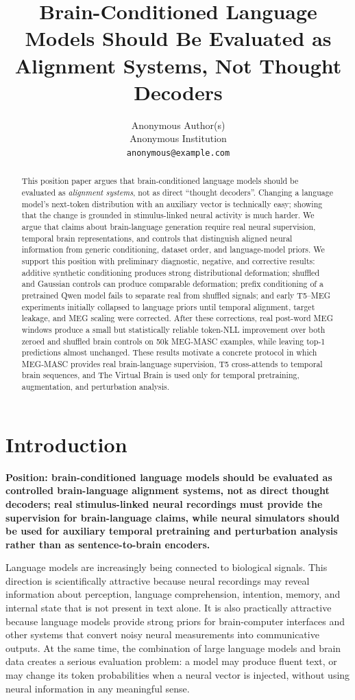 \documentclass{article}
\title{Brain-Conditioned Language Models Should Be Evaluated as Alignment Systems, Not Thought Decoders}
\author{%
  Anonymous Author(s) \\
  Anonymous Institution \\
  \texttt{anonymous@example.com}
}
\begin{document}
\maketitle

\begin{abstract}
This position paper argues that brain-conditioned language models should be evaluated as \emph{alignment systems}, not as direct ``thought decoders''.
Changing a language model's next-token distribution with an auxiliary vector is technically easy; showing that the change is grounded in stimulus-linked neural activity is much harder.
We argue that claims about brain-language generation require real neural supervision, temporal brain representations, and controls that distinguish aligned neural information from generic conditioning, dataset order, and language-model priors.
We support this position with preliminary diagnostic, negative, and corrective results: additive synthetic conditioning produces strong distributional deformation; shuffled and Gaussian controls can produce comparable deformation; prefix conditioning of a pretrained Qwen model fails to separate real from shuffled signals; and early T5--MEG experiments initially collapsed to language priors until temporal alignment, target leakage, and MEG scaling were corrected.
After these corrections, real post-word MEG windows produce a small but statistically reliable token-NLL improvement over both zeroed and shuffled brain controls on 50k MEG-MASC examples, while leaving top-1 predictions almost unchanged.
These results motivate a concrete protocol in which MEG-MASC provides real brain-language supervision, T5 cross-attends to temporal brain sequences, and The Virtual Brain is used only for temporal pretraining, augmentation, and perturbation analysis.
\end{abstract}

\section{Introduction}

\textbf{Position: brain-conditioned language models should be evaluated as controlled brain-language alignment systems, not as direct thought decoders; real stimulus-linked neural recordings must provide the supervision for brain-language claims, while neural simulators should be used for auxiliary temporal pretraining and perturbation analysis rather than as sentence-to-brain encoders.}

Language models are increasingly being connected to biological signals.
This direction is scientifically attractive because neural recordings may reveal information about perception, language comprehension, intention, memory, and internal state that is not present in text alone.
It is also practically attractive because language models provide strong priors for brain-computer interfaces and other systems that convert noisy neural measurements into communicative outputs.
At the same time, the combination of large language models and brain data creates a serious evaluation problem: a model may produce fluent text, or may change its token probabilities when a neural vector is injected, without using neural information in any meaningful sense.
\end{document}
